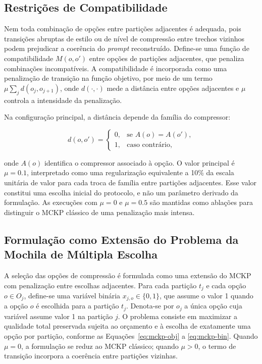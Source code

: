 \subsection{Restrições de Compatibilidade}
\label{subsec:compatibilidade}

Nem toda combinação de opções entre partições adjacentes é adequada, pois transições abruptas de estilo ou de nível de compressão entre trechos vizinhos podem prejudicar a coerência do \textit{prompt} reconstruído. Define-se uma função de compatibilidade $M(o, o')$ entre opções de partições adjacentes, que penaliza combinações incompatíveis. A compatibilidade é incorporada como uma penalização de transição na função objetivo, por meio de um termo $\mu \sum_{j} d(o_j, o_{j+1})$, onde $d(\cdot, \cdot)$ mede a distância entre opções adjacentes e $\mu$ controla a intensidade da penalização.

Na configuração principal, a distância depende da família do compressor:

\begin{equation}
\label{eq:distancia-familia}
d(o,o')=
\begin{cases}
0, & \text{se } A(o)=A(o'),\\
1, & \text{caso contrário},
\end{cases}
\end{equation}

onde $A(o)$ identifica o compressor associado à opção. O valor principal é $\mu=0.1$, interpretado como uma regularização equivalente a 10\% da escala unitária de valor para cada troca de família entre partições adjacentes. Esse valor constitui uma escolha inicial do protocolo, e não um parâmetro derivado da formulação. As execuções com $\mu=0$ e $\mu=0.5$ são mantidas como ablações para distinguir o MCKP clássico de uma penalização mais intensa.

\subsection{Formulação como Extensão do Problema da Mochila de Múltipla Escolha}
\label{subsec:mckp}

A seleção das opções de compressão é formulada como uma extensão do MCKP com penalização entre escolhas adjacentes. Para cada partição $t_j$ e cada opção $o \in O_j$, define-se uma variável binária $x_{j,o} \in \{0,1\}$, que assume o valor 1 quando a opção $o$ é escolhida para a partição $t_j$. Denota-se por $o_j$ a única opção cuja variável assume valor 1 na partição $j$. O problema consiste em maximizar a qualidade total preservada sujeita ao orçamento e à escolha de exatamente uma opção por partição, conforme as Equações~\ref{eq:mckp-obj} a \ref{eq:mckp-bin}. Quando $\mu=0$, a formulação se reduz ao MCKP clássico; quando $\mu>0$, o termo de transição incorpora a coerência entre partições vizinhas.


